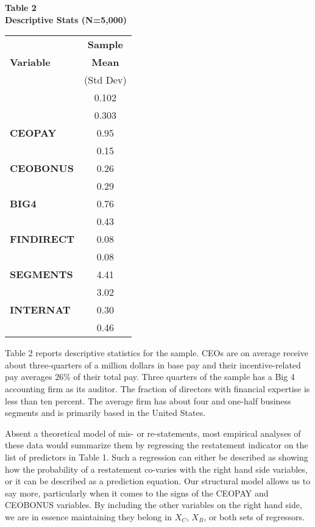 \begin{table}[t]
\begin{center}
{\bf Table 2} \\
{\bf Descriptive Stats (N=5,000)} \\[1em]
\begin{tabular}{|l|c|}
\hline
             & {\bf Sample }   \\
{\bf Variable}  &   {\bf Mean }   \\ 
          &  (Std Dev)   \\ \hline
\T {\bf RESTATE} &   0.102  \\
                           &   0.303  \\[.6em]
    {\bf CEOPAY} &     0.95  \\
                           &     0.15  \\[.6em]
    {\bf CEOBONUS} &    0.26  \\
                           &     0.29  \\[.6em]
    {\bf BIG4} &   0.76  \\
                           &     0.43  \\[.6em]
    {\bf FINDIRECT} &    0.08  \\
                           &     0.08  \\[.6em]
    {\bf SEGMENTS} &    4.41  \\
                           &    3.02  \\[.6em]
    {\bf INTERNAT} &     0.30  \\
                           &     0.46  \\[.6em]
\hline
\end{tabular}
\end{center}
\end{table}

Table 2 reports descriptive statistics for the sample. CEOs are on average receive about three-quarters
of a million dollars in base pay and their incentive-related pay averages 26\% of their total pay.
Three quarters of the sample has a Big 4 accounting firm as its auditor. The fraction of directors
with financial expertise is less than ten percent. The average firm has about four and one-half
business segments and is primarily based in the United States.

Absent a theoretical model of mis- or re-statements, most empirical
analyses of these data would summarize them by regressing the restatement
indicator on the list of predictors in Table 1. Such a regression can either be described
as showing how the probability of a restatement co-varies with the right hand side variables,
or it can be described as a prediction equation. Our structural model allows us to say more,
particularly when it comes to the signs of the CEOPAY and CEOBONUS variables. By including
the other variables on the right hand side, we are in essence maintaining they belong in
$X_C$, $X_B$, or both sets of regressors.

